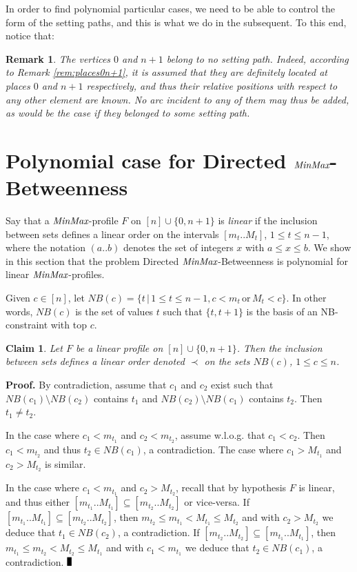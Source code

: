 \documentclass{article}
\newcommand{\M}{\mbox{\it MinMax}}
\newcommand{\n}{[n]}
\newtheorem{fait}{Claim}
\newtheorem{rmk}{Remark}
\newcommand{\br}{\begin{rmk}\rm}
\newcommand{\er}{\end{rmk}}
\newcommand{\bfn}{\begin{fait}}
\newcommand{\efn}{\end{fait}}
\renewcommand{\Box}{\rule{1.5mm}{3mm}}
\begin{document}
In order to find polynomial particular cases, we need to be able to control the
form of the setting paths, and this is what we do in the subsequent. To this end,
notice that:

\br
The vertices $0$ and $n+1$ belong to no setting path. Indeed, according to Remark \ref{rem:places0n+1}, it is assumed that they are definitely located at places
$0$ and $n+1$ respectively, and thus their relative positions with respect to any other
element are known. No arc incident to any of them may thus be added, as would be the
case if they belonged to some setting path.
\label{rem:no0n+1} 
\er



\section{Polynomial case for {\sc Directed $\M$-Betweenness}}\label{sect:Particular}

Say that a $\M$-profile $F$ on $\n\cup\{0,n+1\}$ is {\it linear} if the inclusion between sets defines a linear order on the intervals
$[m_t..M_t]$, $1\leq t\leq n-1$, where the notation $(a..b)$ denotes the set of integers $x$ with $a\leq x\leq b$.
We show in this section that the problem {\sc Directed $\M$-Betweenness} is polynomial for linear $\M$-profiles.

Given $c\in [n]$, let $NB(c)=\{t\, |\, 1\leq t\leq n-1, c< m_t\, \mbox{or}\, M_t<c\}$. In other words, $NB(c)$ is the set of values $t$ such that
$\{t,t+1\}$ is the basis of an NB-constraint with top $c$.

\bfn
Let $F$ be a linear profile on  $[n]\cup\{0,n+1\}$. Then the inclusion between sets defines a linear order denoted $\prec$ on
the sets $NB(c)$, $1\leq c\leq n$.
\label{claim:totalNB}
\efn


{\bf Proof.} By contradiction, assume that $c_1$ and $c_2$ exist such that $NB(c_1)\setminus NB(c_2)$ contains
$t_1$ and $NB(c_2)\setminus NB(c_1)$ contains $t_2$. Then $t_1\neq t_2$. 

In the case where $c_1<m_{t_1}$ and $c_2<m_{t_2}$, assume w.l.o.g. that $c_1<c_2$. Then $c_1<m_{t_2}$
and thus $t_2\in NB(c_1)$, a contradiction.  The case where  $c_1>M_{t_1}$ and $c_2>M_{t_2}$
is similar.

In the case where $c_1<m_{t_1}$ and $c_2>M_{t_2}$,
recall that by hypothesis $F$ is linear, and thus either $[m_{t_1}..M_{t_1}]\subseteq [m_{t_2}..M_{t_2}]$ or vice-versa.
If $[m_{t_1}..M_{t_1}]\subseteq [m_{t_2}..M_{t_2}]$, then $m_{t_2}\leq m_{t_1}< M_{t_1}\leq M_{t_2}$
and with $c_2>M_{t_2}$ we deduce that $t_1\in NB(c_2)$, a contradiction. If $[m_{t_2}..M_{t_2}]\subseteq [m_{t_1}..M_{t_1}]$, then $m_{t_1}\leq m_{t_2}< M_{t_2}\leq M_{t_1}$
and with $c_1<m_{t_1}$ we deduce that $t_2\in NB(c_1)$, a contradiction. $\Box$
\end{document}
